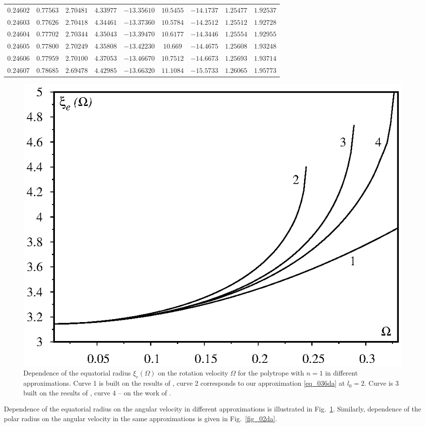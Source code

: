 \documentclass{caosp308}
\begin{document}
\begin{table}[htb]
{{\begin{tabular}{ccccccccc}
$0.24602$ & $0.77563$ & $2.70481$ & $4.33977$ & $-13.35610$ & $10.5455$ & $-14.1737$ & $1.25477$ & $1.92537$\\
$0.24603$ & $0.77626$ & $2.70418$ & $4.34461$ & $-13.37360$ & $10.5784$ & $-14.2512$ & $1.25512$ & $1.92728$\\
$0.24604$ & $0.77702$ & $2.70344$ & $4.35043$ & $-13.39470$ & $10.6177$ & $-14.3446$ & $1.25554$ & $1.92955$\\
$0.24605$ & $0.77800$ & $2.70249$ & $4.35808$ & $-13.42230$ & $10.669$ & $-14.4675$ & $1.25608$ & $1.93248$\\
$0.24606$ & $0.77959$ & $2.70100$ & $4.37053$ & $-13.46670$ & $10.7512$ & $-14.6673$ & $1.25693$ & $1.93714$\\
$0.24607$ & $0.78685$ & $2.69478$ & $4.42985$ & $-13.66320$ & $11.1084$ & $-15.5733$ & $1.26065$ & $1.95773$\\
\hline\hline
\end{tabular}}}
\end{table}
\begin{figure}[h!]
\center\includegraphics[width=.7\textwidth]{fig_01.eps}
\caption{Dependence of the equatorial radius $\xi_{e}(\Omega)$  on the rotation velocity $\Omega$ for the polytrope with $n=1$ in different approximations. Curve 1 is built on the results of  \citet{1933MNRAS..93..390C}, curve 2 corresponds to our approximation \eqref{eq_036da} at $l_{0}=2$. Curve is 3 built on the results of \citet{1964ApJ...140..552J}, curve 4 -- on the work of \citet{1980Ap&SS..71..415C}.}
\label{fig_01da}
\end{figure}
Dependence of the equatorial radius on the angular velocity in different approximations is illustrated in Fig.~\ref{fig_01da}. Similarly, dependence of the polar radius on the angular velocity in the same approximations is given in Fig.~\ref{fig_02da}.
\end{document}
